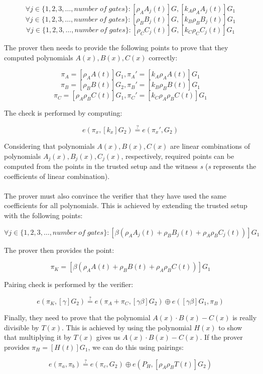 $$\forall j \in \{1, 2, 3, \ldots, number\;of\;gates\} : [\rho_A A_j(t)]G, [k_A \rho_A A_j(t)]G_1 $$
$$\forall j \in \{1, 2, 3, \ldots, number\;of\;gates\} : [\rho_B B_j(t)]G, [k_B \rho_B B_j(t)]G_1 $$ 
$$\forall j \in \{1, 2, 3, \ldots, number\;of\;gates\} : [\rho_C C_j(t)]G, [k_C \rho_C C_j(t)]G_1 $$ 

The prover then needs to provide the following points to prove that they computed polynomials $A(x), B(x), C(x)$ correctly:

$$\pi_A = [\rho_A A(t)]G_1, \pi_A' = [k_A \rho_A A(t)]G_1$$
$$\pi_B = [\rho_B B(t)]G_2, \pi_B' = [k_B \rho_B B(t)]G_1$$
$$\pi_C = [\rho_A \rho_B C(t)]G_1, \pi_C' = [k_C \rho_A \rho_B C(t)]G_1$$

The check is performed by computing:

$$ e(\pi_x, [k_x]G_2) \stackrel{?}{=} e(\pi_x', G_2) $$

Considering that polynomials $A(x), B(x), C(x)$ are linear combinations of polynomials $A_j(x), B_j(x), C_j(x)$, respectively, required points can be computed from the points in the trusted setup and the witness \textit{s} (\textit{s} represents the coefficients of linear combination).\\
\\
The prover must also convince the verifier that they have used the same coefficients for all polynomials. This is achieved by extending the trusted setup with the following points:

$$\forall j \in \{1, 2, 3, \ldots, number\;of\;gates\} : [\beta(\rho_A A_j(t) + \rho_B B_j(t) + \rho_A \rho_B C_j(t))]G_1 $$

The prover then provides the point:

$$ \pi_{K} = [\beta(\rho_A A(t) + \rho_B B(t) + \rho_A \rho_B C(t))]G_1 $$

Pairing check is performed by the verifier:

$$ e(\pi_K, [\gamma]G_2) \stackrel{?}{=} e(\pi_A + \pi_C, [\gamma\beta]G_2) \oplus e([\gamma\beta]G_1, \pi_B) $$

Finally, they need to prove that the polynomial $A(x) \cdot B(x) - C(x)$ is really divisible by $T(x)$. This is achieved by using the polynomial $H(x)$ to show that multiplying it by $T(x)$ gives us $A(x) \cdot B(x) - C(x)$. If the prover provides $\pi_H = [H(t)]G_1$, we can do this using pairings:

$$ e(\pi_a, \pi_b) \stackrel{?}{=} e(\pi_c, G_2) \oplus e(P_H, [\rho_A \rho_B T(t)]G_2) $$

